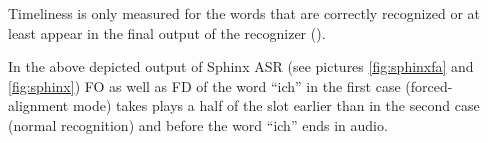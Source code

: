 Timeliness is only measured for the words that are correctly recognized or
at least appear in the final output of the recognizer  (\parencite
{Baumann2016}).

In the above depicted output of Sphinx ASR  (see pictures \ref {fig:sphinxfa}
and \ref {fig:sphinx}) FO as well as FD of the word ``ich''  in the first case (forced-alignment mode)
takes plays a half of the slot earlier than in the second case (normal
recognition) and before the word ``ich'' ends in audio. 

 





 

 